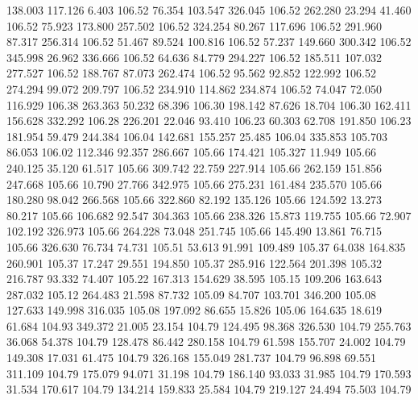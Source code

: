  138.003  117.126    6.403       106.52
  76.354  103.547  326.045       106.52
 262.280   23.294   41.460       106.52
  75.923  173.800  257.502       106.52
 324.254   80.267  117.696       106.52
 291.960   87.317  256.314       106.52
  51.467   89.524  100.816       106.52
  57.237  149.660  300.342       106.52
 345.998   26.962  336.666       106.52
  64.636   84.779  294.227       106.52
 185.511  107.032  277.527       106.52
 188.767   87.073  262.474       106.52
  95.562   92.852  122.992       106.52
 274.294   99.072  209.797       106.52
 234.910  114.862  234.874       106.52
  74.047   72.050  116.929       106.38
 263.363   50.232   68.396       106.30
 198.142   87.626   18.704       106.30
 162.411  156.628  332.292       106.28
 226.201   22.046   93.410       106.23
  60.303   62.708  191.850       106.23
 181.954   59.479  244.384       106.04
 142.681  155.257   25.485       106.04
 335.853  105.703   86.053       106.02
 112.346   92.357  286.667       105.66
 174.421  105.327   11.949       105.66
 240.125   35.120   61.517       105.66
 309.742   22.759  227.914       105.66
 262.159  151.856  247.668       105.66
  10.790   27.766  342.975       105.66
 275.231  161.484  235.570       105.66
 180.280   98.042  266.568       105.66
 322.860   82.192  135.126       105.66
 124.592   13.273   80.217       105.66
 106.682   92.547  304.363       105.66
 238.326   15.873  119.755       105.66
  72.907  102.192  326.973       105.66
 264.228   73.048  251.745       105.66
 145.490   13.861   76.715       105.66
 326.630   76.734   74.731       105.51
  53.613   91.991  109.489       105.37
  64.038  164.835  260.901       105.37
  17.247   29.551  194.850       105.37
 285.916  122.564  201.398       105.32
 216.787   93.332   74.407       105.22
 167.313  154.629   38.595       105.15
 109.206  163.643  287.032       105.12
 264.483   21.598   87.732       105.09
  84.707  103.701  346.200       105.08
 127.633  149.998  316.035       105.08
 197.092   86.655   15.826       105.06
 164.635   18.619   61.684       104.93
 349.372   21.005   23.154       104.79
 124.495   98.368  326.530       104.79
 255.763   36.068   54.378       104.79
 128.478   86.442  280.158       104.79
  61.598  155.707   24.002       104.79
 149.308   17.031   61.475       104.79
 326.168  155.049  281.737       104.79
  96.898   69.551  311.109       104.79
 175.079   94.071   31.198       104.79
 186.140   93.033   31.985       104.79
 170.593   31.534  170.617       104.79
 134.214  159.833   25.584       104.79
 219.127   24.494   75.503       104.79
